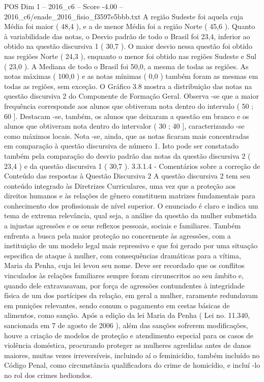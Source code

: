 \begin{textsample}{POS Dim 1 – 2016\_c6 – Score -4.00 – 2016\_c6/enade\_2016\_fisio\_f3597e5bbb.txt}
A região Sudeste foi aquela cuja Média foi maior ( 48,4 ), e a de menor Média foi a região Norte ( 45,6 ).
Quanto à variabilidade das notas, o Desvio padrão de todo o Brasil foi 23,4, inferior ao obtido na questão discursiva 1 ( 30,7 ).
O maior desvio nessa questão foi obtido nas regiões Norte ( 24,3 ), enquanto o menor foi obtido nas regiões Sudeste e Sul ( 23,0 ).
A Mediana de todo o Brasil foi 50,0, a mesma de todas as regiões.
As notas máximas ( 100,0 ) e as notas mínimas ( 0,0 ) também foram as mesmas em todas as regiões, sem exceção.
O Gráfico 3.8 mostra a distribuição das notas na questão discursiva 2 do Componente de Formação Geral.
Observa -se que a maior frequência corresponde aos alunos que obtiveram nota dentro do intervalo ( 50 ; 60 ].
Destacam -se, também, os alunos que deixaram a questão em branco e os alunos que obtiveram nota dentro do intervalor ( 30 ; 40 ], caracterizando -se como máximos locais.
Nota -se, ainda, que as notas ficaram mais concentradas em comparação à questão discursiva de número 1.
Isto pode ser constatado também pela comparação do desvio padrão das notas da questão discursiva 2 ( 23,4 ) e da questão discursiva 1 ( 30,7 ). 3.3.1.4 - Comentários sobre a correção de Conteúdo das respostas à Questão Discursiva 2 A questão discursiva 2 tem seu conteúdo integrado às Diretrizes Curriculares, uma vez que a proteção aos direitos humanos e às relações de gênero constituem matrizes fundamentais para conhecimento dos profissionais de nível superior.
O enunciado é claro e indica um tema de extrema relevância, qual seja, a análise da questão da mulher submetida a injustas agressões e os seus reflexos pessoais, sociais e familiares.
Também enfrenta a busca pela maior proteção no concernente às agressões, com a instituição de um modelo legal mais repressivo e que foi gerado por uma situação especifica de ataque à mulher, com consequências dramáticas para a vítima, Maria da Penha, cuja lei levou seu nome.
Deve ser recordado que os conflitos vinculados às relações familiares sempre foram circunscritos ao seu âmbito e, quando dele extravasavam, por força de agressões contundentes à integridade física de um dos partícipes da relação, em geral a mulher, raramente redundavam em punições relevantes, sendo comum o pagamento em cestas básicas de alimentos, como sanção.
Após a edição da lei Maria da Penha ( Lei no. 11.340, sancionada em 7 de agosto de 2006 ), além das sanções sofrerem modificações, houve a criação de modelos de proteção e atendimento especial para os casos de violência doméstica, procurando proteger as mulheres agredidas antes de danos maiores, muitas vezes irreversíveis, incluindo aí o feminicídio, também incluído no Código Penal, como circunstância qualificadora do crime de homicídio, e incluí -lo no rol dos crimes hediondos.

\end{textsample}
